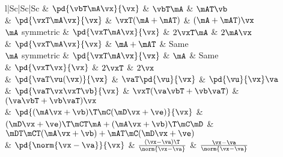 \begin{center}
\begin{tabular}{l|Sc|Sc|Sc}
                           & $\pd{\vbT\mA\vx}{\vx}$                        & $\vbT\mA$                                          & $\mAT\vb$                                     \\
                           & $\pd{\vxT\mA\vx}{\vx}$                        & $\vxT(\mA+\mAT)$                                   & $(\mA+\mAT)\vx$                               \\
$\mA$ symmetric            & $\pd{\vxT\mA\vx}{\vx}$                        & $2\vxT\mA$                                         & $2\mA\vx$                                     \\
                           & $\pd{\vxT\mA\vx}{\vx}$                        & $\mA+\mAT$                                         & Same                                          \\
$\mA$ symmetric            & $\pd{\vxT\mA\vx}{\vx}$                        & $\mA$                                              & Same                                          \\
                           & $\pd{\vxT\vx}{\vx}$                           & $2\vxT$                                            & $2\vx$                                        \\
                           & $\pd{\vaT\vu(\vx)}{\vx}$                      & $\vaT\pd{\vu}{\vx}$                                & $\pd{\vu}{\vx}\va$                            \\
                           & $\pd{\vaT\vx\vxT\vb}{\vx}$                    & $\vxT(\va\vbT+\vb\vaT)$                            & $(\va\vbT+\vb\vaT)\vx$                        \\
                           & $\pd{(\mA\vx+\vb)\T\mC(\mD\vx+\ve)}{\vx}$     & $(\mD\vx+\ve)\T\mCT\mA+(\mA\vx+\vb)\T\mC\mD$       & $\mDT\mCT(\mA\vx+\vb)+\mAT\mC(\mD\vx+\ve)$    \\
                           & $\pd{\norm{\vx-\va}}{\vx}$                    & $\frac{(\vx-\va)\T}{\norm{\vx-\va}}$               & $\frac{\vx-\va}{\norm{\vx-\va}}$              \\
\end{tabular}
\end{center}

